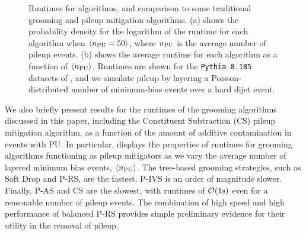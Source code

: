\begin{figure}[t!]
    \caption{
    Runtimes for \PIRANHA{} algorithms, and comparison to some traditional grooming and pileup mitigation algorithms.
    (a) shows the probability density for the logarithm of the runtime for each algorithm when \(\langle n_{\rm PU} = 50\rangle\), where \(n_{\rm PU}\) is the average number of pileup events.
    (b) shows the average runtime for each algorithm as a function of \(\langle n_{\rm PU} \rangle\).
    Runtimes are shown for the \texttt{Pythia 8.185} datasets of , and we simulate pileup by layering a Poisson-distributed number of minimum-bias events over a hard dijet event.
    }
    \label{fig:runtimes}
\end{figure}


We also briefly present results for the runtimes of the grooming algorithms discussed in this paper, including the Constituent Subtraction (CS) pileup mitigation algorithm, as a function of the amount of additive contamination in events with PU.
%
In particular,  displays the properties of runtimes for grooming algorithms functioning as pileup mitigators as we vary the average number of layered minimum bias events, \(\langle n_{\rm PU} \rangle\).
%
The tree-based grooming strategies, such as Soft Drop and P-RS, are the fastest.
%
P-IVS is an order of magnitude slower.
%
Finally, P-AS and CS are the slowest, with runtimes of \(\mathcal O({\rm 1s})\) even for a reasonable number of pileup events.
%
The combination of high speed and high performance of balanced P-RS provides simple preliminary evidence for their utility in the removal of pileup.
\\~\\


